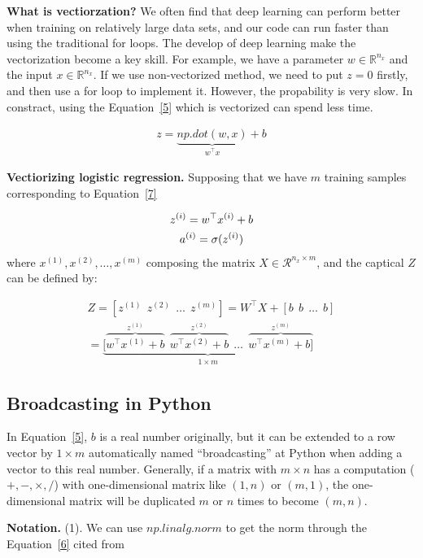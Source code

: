 \documentclass[a4paper]{article}
\begin{document}
{\bf What is vectiorzation?} We often find that deep learning can perform better when training on relatively large data sets, and our code can run faster than using the traditional for loops. The develop of deep learning make the vectorization become a key skill. For example, we have a parameter $w \in \mathbb{R}^{n_x}$ and the input $x \in {\mathbb{R}^{n_x}}$. If we use non-vectorized method, we need to put $z =  0$ firstly, and then use a for loop to implement it. However, the propability is very slow. In constract, using the Equation~\ref{5} which is vectorized can spend less time. 

\begin{gather}
z = \underbrace{np.dot(w,x)}_{w^\top x} + b
\label{5}
\end{gather}

{\bf Vectiorizing logistic regression.} Supposing that we have $m$ training samples corresponding to Equation~\ref{7}

\begin{gather}
\label{7}
z^{(i)} = w^{\top}x^{(i)} + b \\ \notag
a^{(i)} = \sigma(z^{(i)})
\end{gather}
where $x^{(1)},x^{(2)},\dots,x^{(m)}$ composing the matrix $X \in \mathcal{R}^{n_x\times m}$, and the captical $Z$ can be defined by:

\begin{gather}
Z = [z^{(1)}~~z^{(2)}~~\dots~~z^{(m)}] = W^{\top}X + [b~~b~~\dots~~b] \\
= \underbrace{[\overbrace{w^{\top}x^{(1)} + b}^{z^{(1)}}~~\overbrace{w^{\top}x^{(2)} + b}^{z^{(2)}}~~\dots~~\overbrace{w^{\top}x^{(m)} + b]}^{z^{(m)}}}_{1\times m}
\end{gather}

\subsection{Broadcasting in Python}

In Equation~\ref{5}, $b$ is a real number originally, but it can be extended to a row vector by $1\times m$ automatically named ``broadcasting'' at Python when adding a vector to this real number. Generally, if a matrix with $m\times n$ has a computation ($+,-,\times,/$) with one-dimensional matrix like $(1,n)$ or $(m,1)$, the one-dimensional matrix will be duplicated $m$ or $n$ times to become $(m,n)$.

{\bf Notation.} (1). We can use $np.linalg.norm$ to get the norm through the Equation~\ref{6} cited from~\cite{CSDN}
\end{document}
